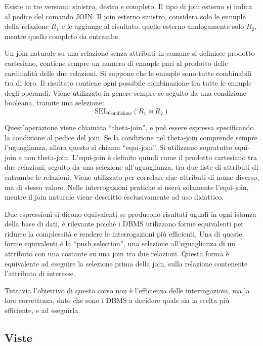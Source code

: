 \documentclass{article}
\numberwithin{equation}{subsection}
\begin{document}
Esiste in tre versioni: sinistro, destro e completo. Il tipo di join esterno si indica al pedice del comando JOIN. Il join esterno sinistro, considera solo le ennuple della relazione $R_1$ e le aggiunge al 
risultato, quello esterno analogamente solo $R_2$, mentre quello completo da entrambe. 


Un join naturale su una relazione senza attributi in comune si definisce prodotto cartesiano, contiene sempre un numero di ennuple pari al prodotto delle cardinalità delle due relazioni. Si suppone che le ennuple 
sono tutte combinabili tra di loro. Il risultato contiene ogni possibile combinazione tra tutte le ennuple degli operandi. 
Viene utilizzato in genere sempre se seguito da una condizione booleana, tramite una selezione:
\begin{equation*}
    \mbox{SEL}_{\mbox{Condizione}}(R_1\Join R_2)
\end{equation*}

Quest'operazione viene chiamata ``theta-join'', e può essere espressa specificando la condizione al pedice del join. Se la condizione nel theta-join comprende sempre l'uguaglianza, allora questo si chiama 
``equi-join''. Si utilizzano sopratutto equi-join e non theta-join. L'equi-join è definito quindi come il prodotto cartesiano tra due relazioni, seguito da una selezione all'uguaglianza, tra due liste di attributi 
di entrambe le relazioni. Viene utilizzato per correlare due attributi di nome diverso, ma di stesso valore. 
Nelle interrogazioni pratiche si userà solamente l'equi-join, mentre il join naturale viene descritto esclusivamente ad uso didattico. 

Due espressioni si dicono equivalenti se producono risultati uguali in ogni istanza della base di dati, è rilevante poiché i DBMS utilizzano forme equivalenti per ridurre la complessità e rendere le interrogazioni 
più efficienti. 
Una di queste forme equivalenti è la ``push selection'', una selezione all'uguaglianza di un attributo con una costante su una join tra due relazioni. Questa forma è equivalente ad eseguire la selezione prima della 
join, sulla relazione contenente l'attributo di interesse. 

Tuttavia l'obiettivo di questo corso non è l'efficienza delle interrogazioni, ma la loro correttezza, dato che sono i DBMS a decidere quale sia la scelta più efficiente, e ad eseguirla. 

\subsection{Viste}
\end{document}
